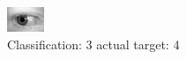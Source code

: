 \begin{figure}[h!]
\begin{center}
\includegraphics[width=0.60\columnwidth]{figures/ID739_class_3_target_4.png}
\end{center}
\caption{ Classification: 3 actual target: 4}
\label{fig:ID739_class_3_target_4}
\end{figure}
